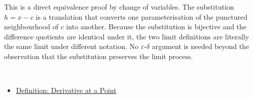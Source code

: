 \begin{remark*}
This is a direct equivalence proof by change of variables. The substitution $h = x - c$ is a translation that converts one parameterisation of the punctured neighbourhood of $c$ into another. Because the substitution is bijective and the difference quotients are identical under it, the two limit definitions are literally the same limit under different notation. No $\varepsilon$-$\delta$ argument is needed beyond the observation that the substitution preserves the limit process.
\end{remark*}

\begin{remark*}[Dependencies]~\\
\begin{itemize}
  \item \hyperref[def:derivative-at-a-point]{Definition: Derivative at a Point}
\end{itemize}
\end{remark*}

\clearpage
